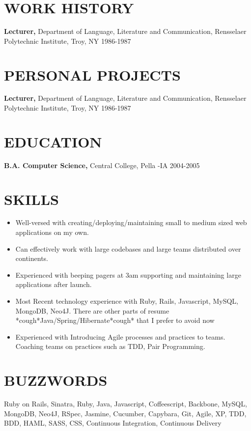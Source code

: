 \documentclass{res}
\begin{document}
 


\address{udit.manektala.com \\  uditmanektala@gmail.com \\  (515) 770-2500}        
                                  
\begin{resume}

\section{WORK HISTORY}          
    {\bf Lecturer,} Department of Language, Literature and 
    Communication, Rensselaer Polytechnic Institute, Troy, NY 
    1986-1987 

 
\section{PERSONAL PROJECTS}          
    {\bf Lecturer,} Department of Language, Literature and 
    Communication, Rensselaer Polytechnic Institute, Troy, NY 
    1986-1987 

 
\section{EDUCATION}
    {\bf B.A. Computer Science,} Central College, Pella -IA
    2004-2005


\section{SKILLS}          
 \begin{itemize} \itemsep -2pt  %
\item Well-versed with creating/deploying/maintaining small to medium sized web applications on my own.
\item Can effectively work with large codebases and large teams distributed over continents.
\item Experienced with beeping pagers at 3am supporting and maintaining large applications after launch.
\item Most Recent technology experience with Ruby, Rails, Javascript, MySQL, MongoDB, Neo4J. There are other parts of resume *cough*Java/Spring/Hibernate*cough* that I prefer to avoid now
\item Experienced with Introducing Agile processes and practices to teams. Coaching teams on practices such as TDD, Pair Programming.

 \end{itemize}


\section{BUZZWORDS}          
Ruby on Rails, Sinatra, Ruby, Java, Javascript, Coffeescript, Backbone, MySQL, MongoDB, Neo4J, RSpec, Jasmine, Cucumber, Capybara, Git, Agile, XP, TDD, BDD, HAML, SASS, CSS, Continuous Integration, Continuous Delivery 
 
\end{resume}
\end{document}

